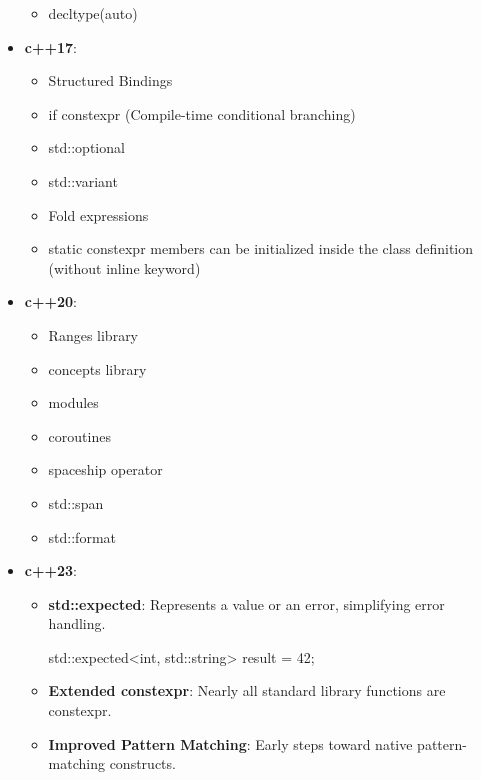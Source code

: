\documentclass{report}
\begin{document}
\begin{itemize}
\begin{itemize}
            \item decltype(auto)
        \end{itemize}
    \item \textbf{c++17}: 
        \begin{itemize}
            \item Structured Bindings
            \item if constexpr (Compile-time conditional branching)
            \item std::optional
            \item std::variant
            \item Fold expressions
            \item static constexpr members can be initialized inside the class definition (without inline keyword)
        \end{itemize}
    \item \textbf{c++20}: 
        \begin{itemize}
            \item Ranges library
            \item concepts library
            \item modules
            \item coroutines
            \item spaceship operator
            \item std::span
            \item std::format
        \end{itemize}
    \item \textbf{c++23}: 
        \begin{itemize}
            \item \textbf{std::expected}: Represents a value or an error, simplifying error handling.
                \bigbreak \noindent 
                \begin{cppcode}
                std::expected<int, std::string> result = 42;
                \end{cppcode}
            \item \textbf{Extended constexpr}: Nearly all standard library functions are constexpr.
            \item \textbf{Improved Pattern Matching}: Early steps toward native pattern-matching constructs.
        \end{itemize}
\end{itemize}

























    
\end{document}
